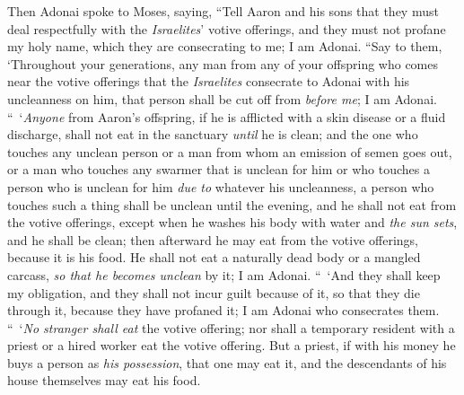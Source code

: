 \begin{biblechapter} %
 Then Adonai spoke to Moses, saying,
\verse “Tell Aaron and his sons that they must deal respectfully with the \textit{Israelites}’ votive offerings, and they must not profane my holy name, which they are consecrating to me; I am Adonai.
\verse “Say to them, ‘Throughout your generations, any man from any of your offspring who comes near the votive offerings that the \textit{Israelites} consecrate to Adonai with his uncleanness on him, that person shall be cut off from \textit{before me}; I am Adonai.
\verse “ ‘\textit{Anyone} from Aaron’s offspring, if he is afflicted with a skin disease or a fluid discharge, shall not eat in the sanctuary \textit{until} he is clean; and the one who touches any unclean person or a man from whom an emission of semen goes out,
\verse or a man who touches any swarmer that is unclean for him or who touches a person who is unclean for him \textit{due to} whatever his uncleanness,
\verse a person who touches such a thing shall be unclean until the evening, and he shall not eat from the votive offerings, except when he washes his body with water
\verse and \textit{the sun sets}, and he shall be clean; then afterward he may eat from the votive offerings, because it is his food.
\verse He shall not eat a naturally dead body or a mangled carcass, \textit{so that he becomes unclean} by it; I am Adonai.
\verse “ ‘And they shall keep my obligation, and they shall not incur guilt because of it, so that they die through it, because they have profaned it; I am Adonai who consecrates them.
\verse “ ‘\textit{No stranger shall eat} the votive offering; nor shall a temporary resident with a priest or a hired worker eat the votive offering.
\verse But a priest, if with his money he buys a person as \textit{his possession}, that one may eat it, and the descendants of his house themselves may eat his food.

\end{biblechapter}
